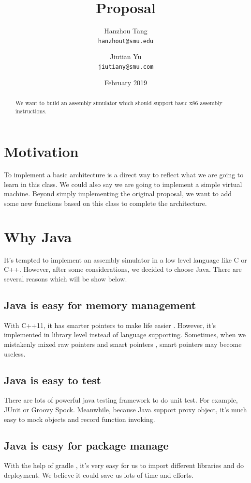 \documentclass[12pt]{extarticle}
\title{Proposal}
\author{
Hanzhou Tang \\
\texttt{hanzhout@smu.edu}
\and 
Jiutian Yu \\
\texttt{jiutiany@smu.com}
}
\date{February 2019}
\begin{document}
\maketitle
    \begin{abstract}
        We want to build an assembly simulator which should support basic x86 assembly instructions.
        \end{abstract}
        \section{Motivation}
        To implement a basic architecture is a direct way to reflect what we are going to learn in this class. We could also say we are going to implement a simple virtual machine. Beyond simply implementing the original proposal, we want to add some new functions based on this class to complete the architecture.  
        \section{Why Java}
        It's tempted to implement an assembly simulator in a low level language like C or C++. However, after some considerations, we decided to choose Java.
        There are several reasons which will be show below. 
        \subsection{Java is easy for memory management}
        With C++11, it has smarter pointers to make life easier \cite{josuttis2012c++}. 
        However, it's implemented in library level instead of language supporting.
        Sometimes, when we mistakenly mixed raw pointers and smart pointers , smart pointers may become useless.
        \subsection{Java is easy to test}
        There are lots of powerful java testing framework to do unit test. For example, JUnit or Groovy Spock. 
        Meanwhile, because Java support proxy object, it's much easy to mock objects and record function invoking.
        \subsection{Java is easy for package manage}
        With the help of gradle \cite{muschko2014gradle}, it's very easy for us to import different libraries and do deployment. We believe it could save us lots of time and efforts.
\end{document}
